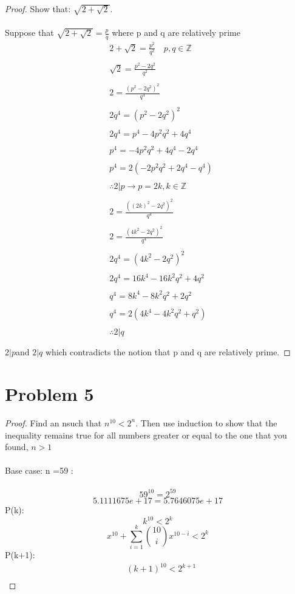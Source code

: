 \documentclass[12pt]{article}
\newcommand{\sect}[1]{\section*{#1}}
\newcommand{\Z}{\mathbb{Z}}
\theoremstyle{definition}
\theoremstyle{remark}
\numberwithin{equation}{section}
\begin{document}
\begin{proof}
  Show that: $\sqrt{2+\sqrt{2}}$. \\\\
  Suppose that  $\sqrt{2+\sqrt{2}}=\frac{p}{q}$ where p and q are relatively prime\\

  \begin{align*}
    &2+\sqrt{2}=\frac{p^2}{q^2}\quad p,q\in \Z\\\\
    &\sqrt{2}=\frac{p^2-2q^2}{q^2}\\\\
    &2=\frac{(p^2-2q^2)^2}{q^4}\\\\
    &2q^4=(p^2-2q^2)^2\\\\
    &2q^4=p^4-4p^2q^2+4q^4\\\\
    &p^4=-4p^2q^2+4q^4-2q^4\\\\
    &p^4=2(-2p^2q^2+2q^4-q^4)\\\\
    &\therefore 2|p\rightarrow p=2k, k \in \Z\\\\
    &2=\frac{((2k)^2-2q^2)^2}{q^4}\\\\
    &2=\frac{(4k^2-2q^2)^2}{q^4}\\\\
    &2q^4=(4k^2-2q^2)^2\\\\
    &2q^4=16k^4-16k^2q^2+4q^2\\\\
    &q^4=8k^4-8k^2q^2+2q^2\\\\
    &q^4=2(4k^4-4k^2q^2+q^2)\\\\
    &\therefore 2|q\\\\
  \end{align*}
  $2|p$and $2|q$ which contradicts the notion that p and q are relatively prime.
\end{proof}
\sect{Problem 5}
\begin{proof}
  Find an nsuch that $n^10 <2^n$. Then use induction to show that the inequality remains
true for all numbers greater or equal to the one that you found, $n>1$\\\\
Base case: n =59 : \\\\
\[
  59^{10}=2^{59}
\]
\[
   5.1111675e+17=5.7646075e+17
\]
P(k):\\
\[
  k^{10}<2^k
\]
\[
  x^{10}+\sum_{i=1}^k\binom{10}{i}x^{10-i}<2^k
\]
P(k+1):
\begin{align*}
  &(k+1)^10<2^{k+1}\\

\end{align*}
\end{proof}
\end{document}
